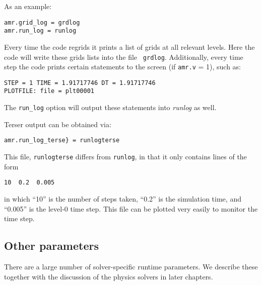 As an example:
\begin{lstlisting}
amr.grid_log = grdlog
amr.run_log = runlog 
\end{lstlisting}  
Every time the code regrids it prints a list of grids at all relevant
levels.  Here the code will write these grids lists into the file {\tt
  grdlog}.  Additionally, every time step the code prints certain
statements to the screen (if {\tt amr.v} = 1), such as:
\begin{verbatim}
STEP = 1 TIME = 1.91717746 DT = 1.91717746 
PLOTFILE: file = plt00001 
\end{verbatim}
The {\tt run\_log} option will output these statements into {\em
  runlog} as well.

Terser output can be obtained via:
\begin{lstlisting}
amr.run_log_terse} = runlogterse
\end{lstlisting}
This file, {\tt runlogterse} differs from {\tt runlog}, in that it
only contains lines of the form
\begin{verbatim}
10  0.2  0.005
\end{verbatim}
in which ``10'' is the number of steps taken, ``0.2'' is the
simulation time, and ``0.005'' is the level-0 time step.  This file
can be plotted very easily to monitor the time step.



\subsection{Other parameters}

There are a large number of solver-specific runtime parameters.  We describe these
together with the discussion of the physics solvers in later chapters.




